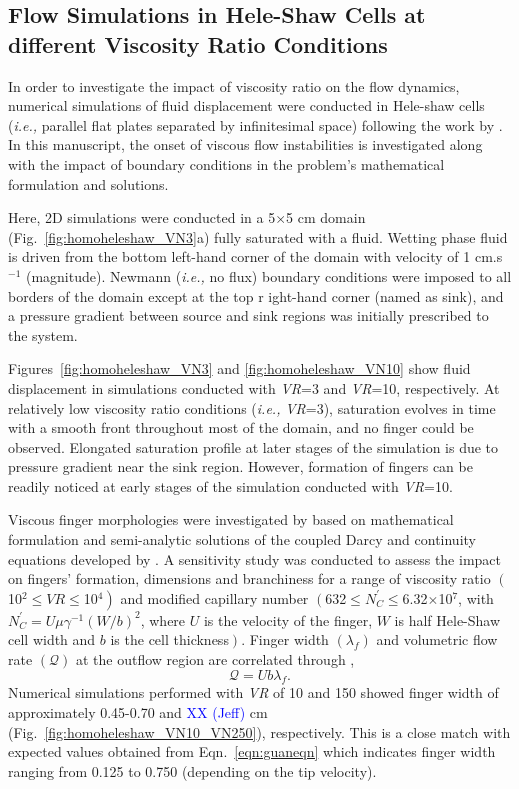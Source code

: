 \documentclass[preprint,authoryear,12pt]{elsarticle}
\newcommand{\blue}{\textcolor{blue}}
\newcommand{\ie}{{\it i.e., }}
\begin{document}
\subsection{Flow Simulations in Hele-Shaw Cells at different Viscosity Ratio Conditions}\label{section:results_homo_hete} 
 
In order to investigate the impact of viscosity ratio on the flow dynamics, numerical simulations of fluid displacement were conducted in Hele-shaw cells (\ie parallel flat plates separated by infinitesimal space) following the work by \citet{saffman_1986}. In this manuscript, the onset of viscous flow instabilities \citep[following his seminal work in][]{saffman_1958} is investigated along with the impact of boundary conditions in the problem's mathematical formulation and solutions.

Here, 2D simulations were conducted in a 5$\times$5 cm domain (Fig.~\ref{fig:homoheleshaw_VN3}a) fully saturated with a fluid. Wetting phase fluid is driven from the bottom left-hand corner of the domain with velocity of 1 cm.s$^{-1}$ (magnitude). Newmann (\ie no flux) boundary conditions were imposed to all borders of the domain except at the top r ight-hand corner (named as sink), and a pressure gradient between source and sink regions was initially prescribed to the system. 

Figures~\ref{fig:homoheleshaw_VN3} and \ref{fig:homoheleshaw_VN10} show fluid displacement in simulations conducted with {\it VR}=3 and {\it VR}=10, respectively. At relatively low viscosity ratio conditions (\ie {\it VR}=3), saturation evolves in time with a smooth front throughout most of the domain, and no finger could be observed. Elongated saturation profile at later stages of the simulation is due to pressure gradient near the sink region. However, formation of fingers can be readily noticed at early stages of the simulation conducted with {\it VR}=10. 

Viscous finger morphologies were investigated by \citet{guan_2003} based on mathematical formulation and semi-analytic solutions of the coupled Darcy and continuity equations developed by \citet{mclean_1981}. A sensitivity study was conducted to assess the impact on fingers' formation, dimensions and branchiness for a range of viscosity ratio $\left(\right.$10$^{2}\le\textit{VR}\le$10$\left.^{4}\right)$ and modified capillary number $\left(\right.$632$\le N_{C}^{'}\le$6.32$\times$10$^{7}$, with $N_{C}^{'}= U\mu\gamma^{-1}(W/b)^{2}$, where $U$ is the velocity of the finger, $W$ is half Hele-Shaw cell width and $b$ is the cell thickness$\left.\right)$. Finger width $\left(\lambda_{f}\right)$ and volumetric flow rate $\left(\mathcal{Q}\right)$ at the outflow region are correlated through \citep{guan_2003}, 
\begin{equation} 
   \mathcal{Q} = U b \lambda_{f}.\label{eqn:guaneqn} 
\end{equation} 
Numerical simulations performed with {\it VR} of 10 and 150 showed finger width of approximately 0.45-0.70 and \blue{XX (Jeff)} cm (Fig.~\ref{fig:homoheleshaw_VN10_VN250}), respectively. This is a close match with expected values obtained from Eqn.~\ref{eqn:guaneqn} which indicates finger width ranging from 0.125 to 0.750 (depending on the tip velocity). 
\end{document}
